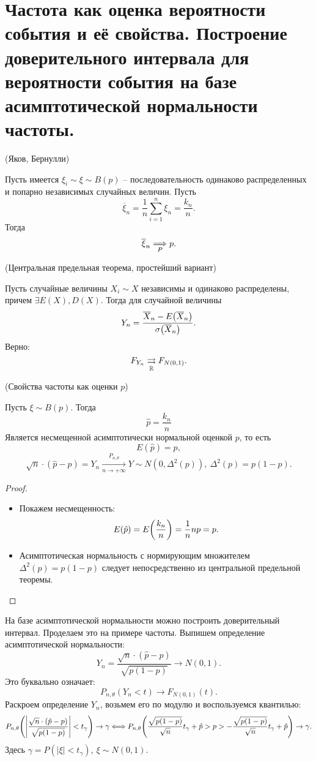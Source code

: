 \section{Частота как оценка вероятности события и её свойства.
    Построение доверительного интервала для вероятности события
на базе асимптотической нормальности частоты.}
\label{sec:normfreq}

\begin{theorem}(Яков, Бернулли)

    Пусть имеется $\xi_i \sim \xi \sim B(p)$ -- последовательность одинаково
	распределенных и попарно независимых случайных величин. Пусть
	\[
		\overline{\xi}_n = \frac{1}{n} \sum_{i = 1}^n{\xi_n} = \frac{k_n}{n}
	.\]
	Тогда
	\[
		\overline{\xi}_n \underset{P}{\Longrightarrow} p
	.\]
\end{theorem}

\begin{theorem}(Центральная предельная теорема, простейший вариант)

	Пусть случайные величины $X_i \sim X$ независимы и одинаково распределены,
	причем $\exists E(X), D(X)$. Тогда для случайной величины
	\[
		Y_n = \frac{\overline{X}_n - E\parens*{\overline{X}_n}}
	{\sigma\parens*{\overline{X}_n}}
	.\]
	Верно:
	\[
		F_{Y_n} \underset{\mathbb{R}}{\rightrightarrows} F_{N(0, 1)}
	.\]
\end{theorem}

\begin{theorem}(Свойства частоты как оценки $p$)

	Пусть $\xi \sim B(p)$. Тогда
	\[
		\hat{p} = \frac{k_n}{n}
	\]
	Является несмещенной асимптотически нормальной оценкой $p$, то есть
	\[
		E(\hat{p}) = p,
	\]
	\[
		\sqrt{n} \cdot (\hat{p} - p) = Y_n \xrightarrow[n \to +\infty]
        {P_{n, \theta}} Y \sim N(0, \Delta^2(p)),~ \Delta^2(p) = p(1 - p)
	.\]
\end{theorem}
\begin{proof}
	\enewline
	\begin{itemize}
		\item Покажем несмещенность:
			\[
				E(\hat{p}) = E\parens*{\frac{k_n}{n}} = \frac{1}{n} np = p
			.\]
		\item Асимптотическая нормальность с нормирующим множителем
			$\Delta^2(p) = p(1 - p)$ следует непосредственно из
			центральной предельной теоремы.
	\end{itemize}
\end{proof}

На базе асимптотической нормальности можно построить доверительный интервал.
Проделаем это на примере частоты. Выпишем определение асимптотической
нормальности:
\[
	Y_n = \frac{\sqrt{n} \cdot (\hat{p} - p)}{\sqrt{p(1 - p)}} \to N(0, 1)
.\]
Это буквально означает:
\[
	P_{n, \theta}(Y_n < t) \to F_{N(0, 1)}(t)
.\]
Раскроем определение $Y_n$, возьмем его по модулю и воспользуемся квантилью:
\[
	P_{n, \theta}\parens*{\abs*{\frac{\sqrt{n}
    \cdot (\hat{p} - p)}{\sqrt{p(1 - p)}} } < t_\gamma} \to \gamma \Llra
    P_{n, \theta}\parens*{\frac{\sqrt{p(1 - p)}}{\sqrt{n}}t_\gamma + \hat{p}
    > p > -\frac{\sqrt{p(1 - p)}}{\sqrt{n}}t_\gamma + \hat{p}} \to \gamma
.\]
Здесь $\gamma = P(|\xi| < t_\gamma),~ \xi \sim N(0, 1)$.
